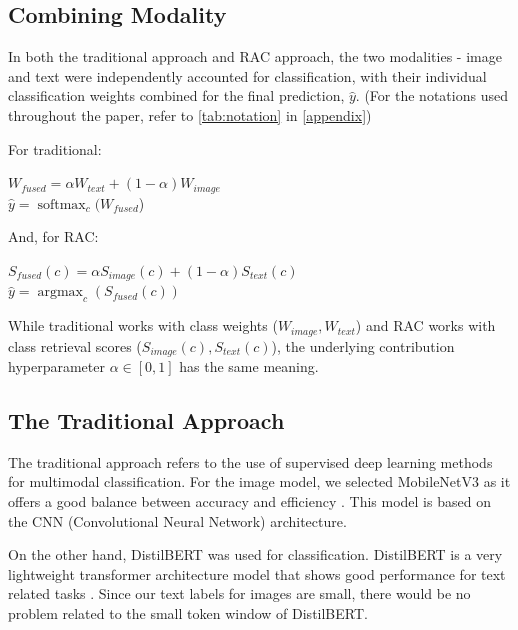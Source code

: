 \documentclass{article}
\DeclareMathOperator*{\argmax}{argmax}
\DeclareMathOperator*{\softmax}{softmax}
\begin{document}
\subsection{Combining Modality}
\label{subsec:combining modality}

In both the traditional approach and RAC approach, the two modalities - image and text were independently accounted for classification, with their individual classification weights combined for the final prediction, $\hat{y}$. (For the notations used throughout the paper, refer to \autoref{tab:notation} in \autoref{appendix})

For traditional:
\begin{center}
  $W_{fused} = \alpha W_{text}+(1-\alpha)W_{image}$\\
  $\hat{y} = \softmax_{c}(W_{fused}$)
\end{center}

And, for RAC:
\begin{center}
  $S_{fused}(c) = \alpha S_{image}(c)+(1-\alpha)S_{text}(c)$\\
  $\hat{y} = \argmax_{c}(S_{fused}(c))$
\end{center}

While traditional works with class weights ($W_{image}, W_{text}$) and RAC works with class retrieval scores ($S_{image}(c), S_{text}(c)$), the underlying contribution hyperparameter $\alpha \in [0,1]$ has the same meaning.

\subsection{The Traditional Approach}

The traditional approach refers to the use of supervised deep learning methods for multimodal classification. For the image model, we selected MobileNetV3 as it offers a good balance between accuracy and efficiency \cite{howard2019searching}. This model is based on the CNN (Convolutional Neural Network) architecture.

On the other hand, DistilBERT was used for classification. DistilBERT is a very lightweight transformer architecture model that shows good performance for text related tasks \cite{sanh2019distilbert}. Since our text labels for images are small, there would be no problem related to the small token window of DistilBERT.

\end{document}
